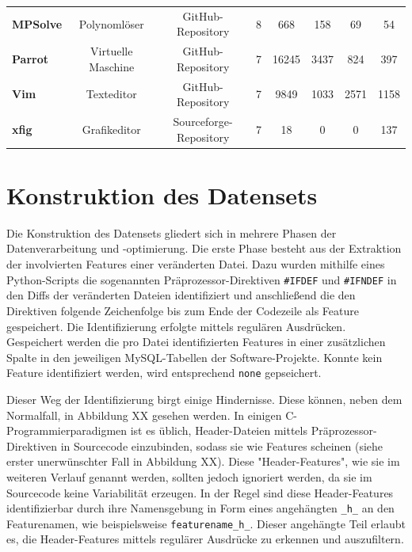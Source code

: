 \begin{table}[]
{\begin{tabular}{lccccccc}
\multicolumn{1}{l|}{\textbf{MPSolve}}  & Polynomlöser         & GitHub-Repository      & 8                   & 668                & 158                  & 69                          & 54                 \\
\multicolumn{1}{l|}{\textbf{Parrot}}   & Virtuelle Maschine   & GitHub-Repository      & 7                   & 16245              & 3437                 & 824                         & 397                 \\
\multicolumn{1}{l|}{\textbf{Vim}}      & Texteditor           & GitHub-Repository      & 7                   & 9849               & 1033                 & 2571                        & 1158                \\
\multicolumn{1}{l|}{\textbf{xfig}}     & Grafikeditor         & Sourceforge-Repository & 7                   & 18                 & 0                    & 0                           & 137                
\end{tabular}%
}
\end{table}

\section{Konstruktion des Datensets}

Die Konstruktion des Datensets gliedert sich in mehrere Phasen der Datenverarbeitung und -optimierung. Die erste Phase besteht aus der Extraktion der involvierten Features einer veränderten Datei. Dazu wurden mithilfe eines Python-Scripts die sogenannten Präprozessor-Direktiven \texttt{\#IFDEF} und \texttt{\#IFNDEF} in den Diffs der veränderten Dateien identifiziert und anschließend die den Direktiven folgende Zeichenfolge bis zum Ende der Codezeile als Feature gespeichert. Die Identifizierung erfolgte mittels regulären Ausdrücken. Gespeichert werden die pro Datei identifizierten Features in einer zusätzlichen Spalte in den jeweiligen MySQL-Tabellen der Software-Projekte. Konnte kein Feature identifiziert werden, wird entsprechend \texttt{none} gepseichert.

Dieser Weg der Identifizierung birgt einige Hindernisse. Diese können, neben dem Normalfall, in Abbildung XX gesehen werden. In einigen C-Programmierparadigmen ist es üblich, Header-Dateien mittels Präprozessor-Direktiven in Sourcecode einzubinden, sodass sie wie Features scheinen (siehe erster unerwünschter Fall in Abbildung XX). Diese "Header-Features", wie sie im weiteren Verlauf genannt werden, sollten jedoch ignoriert werden, da sie im Sourcecode keine Variabilität erzeugen. In der Regel sind diese Header-Features identifizierbar durch ihre Namensgebung in Form eines angehängten \texttt{\_h\_} an den Featurenamen, wie beispielsweise \texttt{featurename\_h\_}. Dieser angehängte Teil erlaubt es, die Header-Features mittels regulärer Ausdrücke zu erkennen und auszufiltern. 

